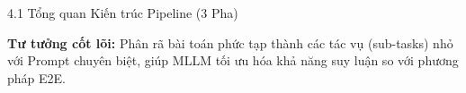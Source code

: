 \documentclass[aspectratio=1610,8pt]{beamer}
\begin{document}
\begin{frame}{4.1 \; Tổng quan Kiến trúc Pipeline (3 Pha)}
\begin{center}
{
    }
    \end{center}

    \vspace{0.3em}
    \textbf{Tư tưởng cốt lõi:} Phân rã bài toán phức tạp thành các tác vụ (sub-tasks) nhỏ với Prompt chuyên biệt, giúp MLLM tối ưu hóa khả năng suy luận so với phương pháp E2E.
\end{frame}
\end{document}
